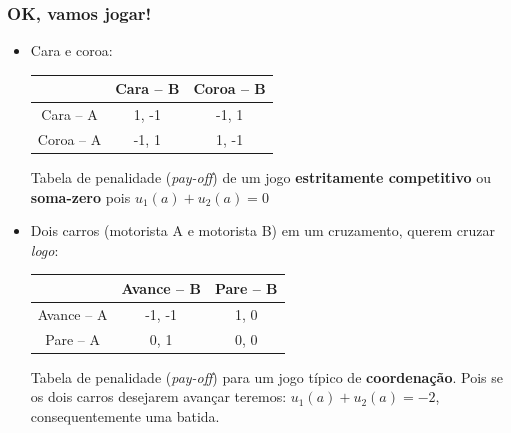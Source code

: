 \begin{frame}
\frametitle{OK, vamos jogar!}

\begin{itemize}
  \item Cara e coroa:
    \begin{center}
      \begin{tabular}{c|c|c}
                 & Cara -- B & Coroa -- B \\ \hline
      Cara -- A   & 1, -1     &  -1, 1      \\ \hline
      Coroa -- A   & -1, 1   & 1, -1         \\ \hline
      \end{tabular}
    \end{center}

Tabela de penalidade (\textit{pay-off}) de um jogo \textbf{estritamente competitivo} ou \textbf{soma-zero}
 pois $u_1(a) + u_2(a) = 0$
\pause

\item Dois carros (motorista A e motorista B) em um cruzamento, querem cruzar \textit{logo}:


    \begin{center}
      \begin{tabular}{c|c|c}
                 & Avance -- B & Pare -- B \\ \hline
      Avance -- A   & -1, -1     &  1, 0      \\ \hline
      Pare -- A     & 0, 1   & 0, 0         \\ \hline
      \end{tabular}
    \end{center}


Tabela de penalidade (\textit{pay-off}) para um jogo típico de \textbf{coordenação}. Pois
se os dois carros desejarem avançar teremos: $u_1(a) + u_2(a) = -2$, consequentemente
uma batida.

\end{itemize}

\end{frame}


